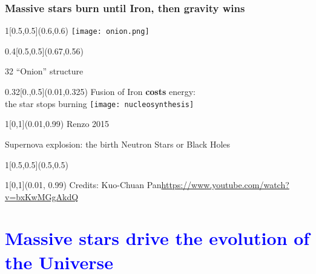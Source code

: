 \documentclass[xcolor=dvipsnames,professionalfonts, aspectratio=169]{beamer}
\begin{document}
\begin{frame}[c]
  \frametitle{Massive stars burn until Iron, then gravity wins}

  \begin{textblock}{1}[0.5,0.5](0.6,0.6)
    \centering
    \texttt{[image: onion.png]}
    \end{textblock}
\begin{textblock}{0.4}[0.5,0.5](0.67,0.56)
    \begin{rotate}{32}
      \centering
      ``Onion'' structure
    \end{rotate}
  \end{textblock}

  \begin{textblock}{0.32}[0.,0.5](0.01,0.325)
    \centering
    Fusion of Iron \textbf{costs} energy:\\
    the star stops burning
    \texttt{[image: nucleosynthesis]}
  \end{textblock}

  \begin{textblock}{1}[0,1](0.01,0.99)
    \textcolor{gray!50}{\tiny Renzo 2015}\hfill\,
  \end{textblock}
\end{frame}


\bgroup
{}
\begin{frame}{\textcolor{whiteish}{Supernova explosion: the birth Neutron Stars or Black Holes}}

  \begin{textblock}{1}[0.5,0.5](0.5,0.5)
    \centering
  \end{textblock}
  \begin{textblock}{1}[0,1](0.01, 0.99)
    \textcolor{gray!50}{\tiny Credits: Kuo-Chuan Pan}\hfill \textcolor{gray!50}{\tiny \url{https://www.youtube.com/watch?v=bxKwMGgAkdQ}}
  \end{textblock}
\end{frame}
\egroup

\AtBeginSection[]{}
\section*{\textcolor{Blue}{Massive stars drive the evolution of the Universe}}
\end{document}
